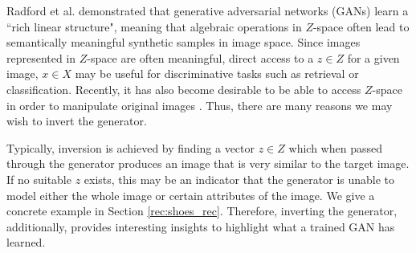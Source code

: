 \documentclass[journal]{IEEEtran}
\begin{document}
Radford et al. \cite{radford2015unsupervised} demonstrated that generative adversarial networks (GANs) learn a ``rich linear structure", meaning that algebraic operations in $Z$-space often lead to semantically meaningful synthetic samples in image space. Since images represented in $Z$-space are often meaningful, direct access to a $z \in Z$ for a given image, $x \in X$ may be useful for discriminative tasks such as retrieval or classification. Recently, it has also become desirable to be able to access $Z$-space in order to manipulate original images \cite{zhu2016generative}. Thus, there are many reasons we may wish to invert the generator.

Typically, inversion is achieved by finding a vector $z \in Z$ which when passed through the generator produces an image that is very similar to the target image. If no suitable $z$ exists, this may be an indicator that the generator is unable to model either the whole image or certain attributes of the image. We give a concrete example in Section \ref{rec:shoes_rec}. Therefore, inverting the generator, additionally, provides interesting insights to highlight what a trained GAN has learned.


\end{document}
